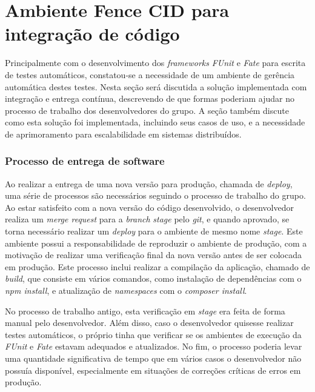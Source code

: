 \hypertarget{fence-continuous-integration-delivery}{%
\section{Ambiente Fence CID para integração de código}\label{fence-continuous-integration-delivery}}

Principalmente com o desenvolvimento dos \emph{frameworks} \emph{FUnit} e \emph{Fate} para escrita de testes automáticos, constatou-se a necessidade de um ambiente de gerência automática destes testes. Nesta seção será discutida a solução implementada com integração e entrega contínua, descrevendo de que formas poderiam ajudar no processo de trabalho dos desenvolvedores do grupo. A seção também discute como esta solução foi implementada, incluindo seus casos de uso, e a necessidade de aprimoramento para escalabilidade em sistemas distribuídos.

\hypertarget{processo-de-entrega-de-software}{%
\subsubsection{\texorpdfstring{Processo de entrega de software}{Processo de entrega de software}}\label{processo-de-entrega-de-software}}

Ao realizar a entrega de uma nova versão para produção, chamada de \emph{deploy}, uma série de processos são necessários seguindo o processo de trabalho do grupo. Ao estar satisfeito com a nova versão do código desenvolvido, o desenvolvedor realiza um \emph{merge request} para a \emph{branch} \emph{stage} pelo \emph{git}, e quando aprovado, se torna necessário realizar um \emph{deploy} para o ambiente de mesmo nome \emph{stage}. Este ambiente possui a responsabilidade de reproduzir o ambiente de produção, com a motivação de realizar uma verificação final da nova versão antes de ser colocada em produção. Este processo inclui realizar a compilação da aplicação, chamado de \emph{build}, que consiste em vários comandos, como instalação de dependências com o \emph{npm install}, e atualização de \emph{namespaces} com o \emph{composer install}.

No processo de trabalho antigo, esta verificação em \emph{stage} era feita de forma manual pelo desenvolvedor. Além disso, caso o desenvolvedor quisesse realizar testes automáticos, o próprio tinha que verificar se os ambientes de execução da \emph{FUnit} e \emph{Fate} estavam adequados e atualizados. No fim, o processo poderia levar uma quantidade significativa de tempo que em vários casos o desenvolvedor não possuía disponível, especialmente em situações de correções críticas de erros em produção.

